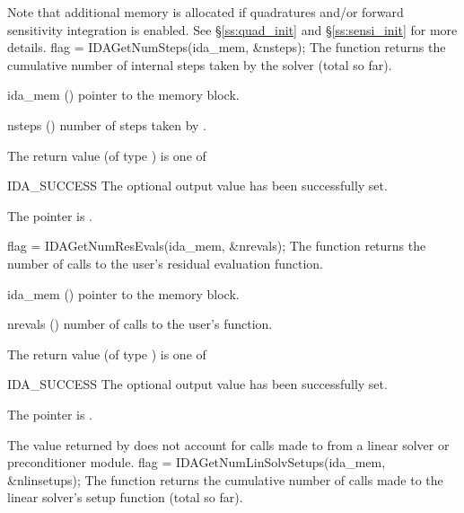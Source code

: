 {{  Note that additional memory is allocated if quadratures and/or forward sensitivity
  integration is enabled. See \S\ref{ss:quad_init} and \S\ref{ss:sensi_init}
  for more details.
}
{
  flag = IDAGetNumSteps(ida\_mem, \&nsteps);
}
{
  The function  returns the cumulative number of internal 
  steps taken by the solver (total so far).
}
{
  \begin{args}
  \item[ida\_mem] ()
    pointer to the {\idas} memory block.
  \item[nsteps] ()
    number of steps taken by {\idas}.
  \end{args}
}
{
  The return value  (of type ) is one of
  \begin{args}
  \item[IDA\_SUCCESS] 
    The optional output value has been successfully set.
  \item[\Id{IDA\_MEM\_NULL}]
    The  pointer is .
  \end{args}
}
{}
{
  flag = IDAGetNumResEvals(ida\_mem, \&nrevals);
}
{
  The function  returns the 
  number of calls to the user's residual evaluation function.
}
{
  \begin{args}
  \item[ida\_mem] ()
    pointer to the {\idas} memory block.
  \item[nrevals] ()
    number of calls to the user's  function.
  \end{args}
}
{
  The return value  (of type ) is one of
  \begin{args}
  \item[IDA\_SUCCESS] 
    The optional output value has been successfully set.
  \item[\Id{IDA\_MEM\_NULL}]
    The  pointer is .
  \end{args}
}
{
  The  value returned by  does not
  account for calls made to  from a linear solver or preconditioner 
  module. 
}
{
  flag = IDAGetNumLinSolvSetups(ida\_mem, \&nlinsetups);
}
{
  The function  returns the
  cumulative number of calls made to the linear solver's setup function 
  (total so far).
}
{
  \begin{args}[nlinsetups]

\end{args}}}
